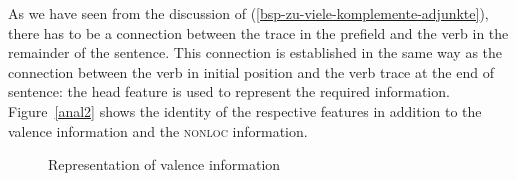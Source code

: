 As we have seen from the discussion of (\ref{bsp-zu-viele-komplemente-adjunkte}), there has to be a connection between the trace in the prefield and
the verb in the remainder of the sentence. This connection is established in the same way as the connection between the verb in initial position and 
the verb trace at the end of sentence: the head feature \dsl is used to represent the required
information. Figure~\vref{anal2} shows the identity of the respective \dsl features  in addition to the valence information and the \textsc{nonloc} information. 

\begin{figure}
\caption{\label{anal2}Representation of valence information}
\end{figure}
